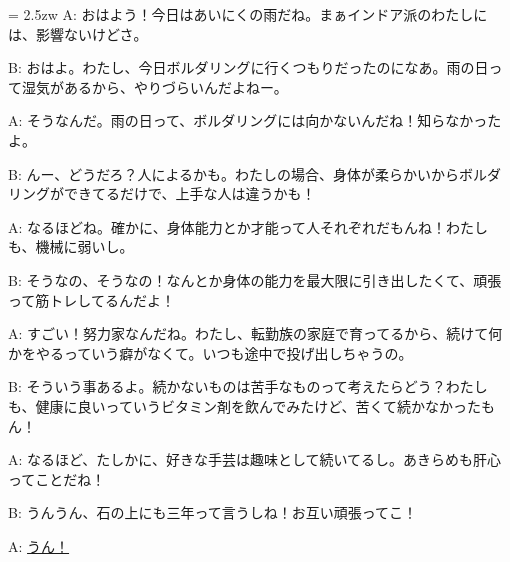 \documentclass[11pt]{amsart}
\title{}
\author{}
\newenvironment{hangall}[1]{\hangindent = 2.5zw\everypar{\hangindent = 2.5zw}}{}
\begin{document}
\maketitle
\begin{hangall}{}%
A: おはよう！今日はあいにくの雨だね。まぁインドア派のわたしには、影響ないけどさ。

B: おはよ。わたし、今日ボルダリングに行くつもりだったのになあ。雨の日って湿気があるから、やりづらいんだよねー。

A: そうなんだ。雨の日って、ボルダリングには向かないんだね！知らなかったよ。

B: んー、どうだろ？人によるかも。わたしの場合、身体が柔らかいからボルダリングができてるだけで、上手な人は違うかも！

A: なるほどね。確かに、身体能力とか才能って人それぞれだもんね！わたしも、機械に弱いし。

B: そうなの、そうなの！なんとか身体の能力を最大限に引き出したくて、頑張って筋トレしてるんだよ！

A: すごい！努力家なんだね。わたし、転勤族の家庭で育ってるから、続けて何かをやるっていう癖がなくて。いつも途中で投げ出しちゃうの。

B: そういう事あるよ。続かないものは苦手なものって考えたらどう？わたしも、健康に良いっていうビタミン剤を飲んでみたけど、苦くて続かなかったもん！

A: なるほど、たしかに、好きな手芸は趣味として続いてるし。あきらめも肝心ってことだね！

B: うんうん、石の上にも三年って言うしね！お互い頑張ってこ！

A: \ul{うん！}\end{hangall}
\end{document}
